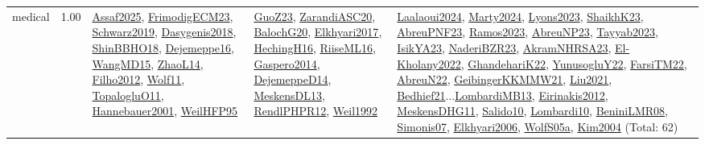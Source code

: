 {\begin{longtable}{p{3cm}r>{\raggedright\arraybackslash}p{6cm}>{\raggedright\arraybackslash}p{6cm}>{\raggedright\arraybackslash}p{8cm}}
\index{medical}\index{ApplicationAreas!medical}medical &  1.00 & \hyperref[detail:Assaf2025]{Assaf2025}, \hyperref[detail:FrimodigECM23]{FrimodigECM23}, \hyperref[detail:Schwarz2019]{Schwarz2019}, \hyperref[detail:Dasygenis2018]{Dasygenis2018}, \hyperref[detail:ShinBBHO18]{ShinBBHO18}, \hyperref[detail:Dejemeppe16]{Dejemeppe16}, \hyperref[detail:WangMD15]{WangMD15}, \hyperref[detail:ZhaoL14]{ZhaoL14}, \hyperref[detail:Filho2012]{Filho2012}, \hyperref[detail:Wolf11]{Wolf11}, \hyperref[detail:TopalogluO11]{TopalogluO11}, \hyperref[detail:Hannebauer2001]{Hannebauer2001}, \hyperref[detail:WeilHFP95]{WeilHFP95} & \hyperref[detail:GuoZ23]{GuoZ23}, \hyperref[detail:ZarandiASC20]{ZarandiASC20}, \hyperref[detail:BalochG20]{BalochG20}, \hyperref[detail:Elkhyari2017]{Elkhyari2017}, \hyperref[detail:HechingH16]{HechingH16}, \hyperref[detail:RiiseML16]{RiiseML16}, \hyperref[detail:Gaspero2014]{Gaspero2014}, \hyperref[detail:DejemeppeD14]{DejemeppeD14}, \hyperref[detail:MeskensDL13]{MeskensDL13}, \hyperref[detail:RendlPHPR12]{RendlPHPR12}, \hyperref[detail:Weil1992]{Weil1992} & \hyperref[detail:Laalaoui2024]{Laalaoui2024}, \hyperref[detail:Marty2024]{Marty2024}, \hyperref[detail:Lyons2023]{Lyons2023}, \hyperref[detail:ShaikhK23]{ShaikhK23}, \hyperref[detail:AbreuPNF23]{AbreuPNF23}, \hyperref[detail:Ramos2023]{Ramos2023}, \hyperref[detail:AbreuNP23]{AbreuNP23}, \hyperref[detail:Tayyab2023]{Tayyab2023}, \hyperref[detail:IsikYA23]{IsikYA23}, \hyperref[detail:NaderiBZR23]{NaderiBZR23}, \hyperref[detail:AkramNHRSA23]{AkramNHRSA23}, \hyperref[detail:El-Kholany2022]{El-Kholany2022}, \hyperref[detail:GhandehariK22]{GhandehariK22}, \hyperref[detail:YunusogluY22]{YunusogluY22}, \hyperref[detail:FarsiTM22]{FarsiTM22}, \hyperref[detail:AbreuN22]{AbreuN22}, \hyperref[detail:GeibingerKKMMW21]{GeibingerKKMMW21}, \hyperref[detail:Liu2021]{Liu2021}, \hyperref[detail:Bedhief21]{Bedhief21}...\hyperref[detail:LombardiMB13]{LombardiMB13}, \hyperref[detail:Eirinakis2012]{Eirinakis2012}, \hyperref[detail:MeskensDHG11]{MeskensDHG11}, \hyperref[detail:Salido10]{Salido10}, \hyperref[detail:Lombardi10]{Lombardi10}, \hyperref[detail:BeniniLMR08]{BeniniLMR08}, \hyperref[detail:Simonis07]{Simonis07}, \hyperref[detail:Elkhyari2006]{Elkhyari2006}, \hyperref[detail:WolfS05a]{WolfS05a}, \hyperref[detail:Kim2004]{Kim2004} (Total: 62)\\

\end{longtable}}
